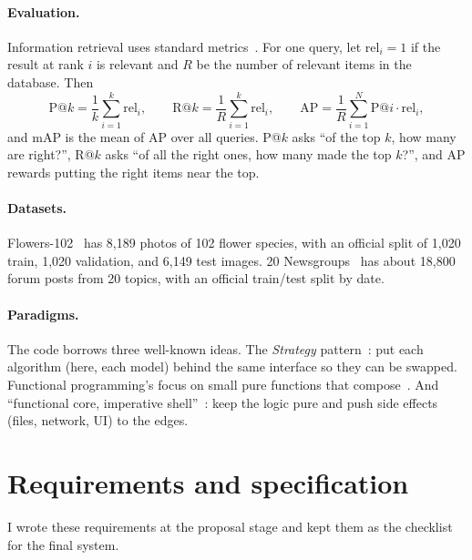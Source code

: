 \documentclass{article}
\begin{document}
\paragraph{Evaluation.} Information retrieval uses standard metrics~\cite{manning2008ir}. For one query, let $\mathrm{rel}_i = 1$ if the result at rank $i$ is relevant and $R$ be the number of relevant items in the database. Then
\begin{equation*}
\mathrm{P@}k = \frac{1}{k}\sum_{i=1}^{k}\mathrm{rel}_i, \qquad
\mathrm{R@}k = \frac{1}{R}\sum_{i=1}^{k}\mathrm{rel}_i, \qquad
\mathrm{AP} = \frac{1}{R}\sum_{i=1}^{N}\mathrm{P@}i\cdot\mathrm{rel}_i ,
\end{equation*}
and mAP is the mean of AP over all queries. P@$k$ asks ``of the top $k$, how many are right?'', R@$k$ asks ``of all the right ones, how many made the top $k$?'', and AP rewards putting the right items near the top.

\paragraph{Datasets.} Flowers-102~\cite{nilsback2008flowers} has 8,189 photos of 102 flower species, with an official split of 1,020 train, 1,020 validation, and 6,149 test images. 20 Newsgroups~\cite{lang1995newsweeder} has about 18,800 forum posts from 20 topics, with an official train/test split by date.

\paragraph{Paradigms.} The code borrows three well-known ideas. The \emph{Strategy} pattern~\cite{gamma1994design}: put each algorithm (here, each model) behind the same interface so they can be swapped. Functional programming's focus on small pure functions that compose~\cite{hughes1989why}. And ``functional core, imperative shell''~\cite{bernhardt2012boundaries}: keep the logic pure and push side effects (files, network, UI) to the edges.

\section{Requirements and specification}

I wrote these requirements at the proposal stage and kept them as the checklist for the final system.
\end{document}
